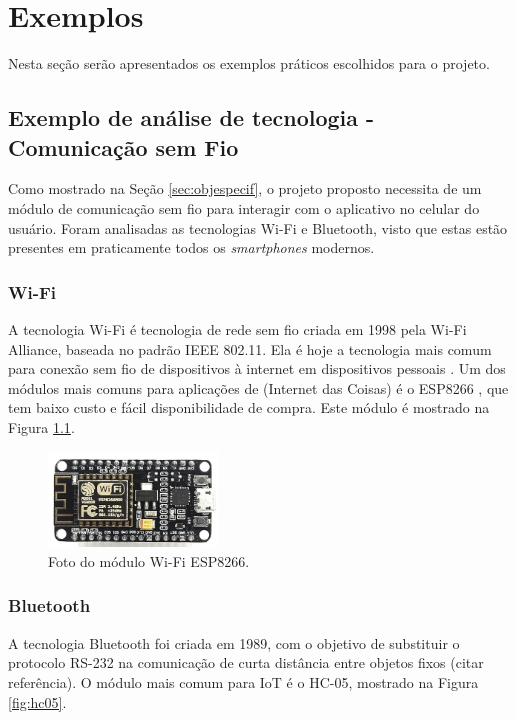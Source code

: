 \chapter{Exemplos}

Nesta seção serão apresentados os exemplos práticos escolhidos para o projeto. 

\section{Exemplo de análise de tecnologia - Comunicação sem Fio}
\label{sec:exemplo}
Como mostrado na Seção \ref{sec:objespecif}, o projeto proposto necessita de um módulo de comunicação sem fio para interagir com o aplicativo no celular do usuário. Foram analisadas as tecnologias Wi-Fi e Bluetooth, visto que estas estão presentes em praticamente todos os \textit{smartphones} modernos.

\subsection{Wi-Fi}
\label{sec:wifi}

A tecnologia Wi-Fi é tecnologia de rede sem fio criada em 1998 pela Wi-Fi Alliance, baseada no padrão IEEE 802.11. Ela é hoje a tecnologia mais comum para conexão sem fio de dispositivos à internet em dispositivos pessoais \cite{WiFi2020}. Um dos módulos mais comuns para aplicações de  (Internet das Coisas) é o ESP8266 \cite{datasheet8266}, que tem baixo custo e fácil disponibilidade de compra. Este módulo é mostrado na Figura \ref{fig:esp8266}.

\begin{figure}[!htb]
	\centering
	\includegraphics[width=0.4\textwidth]{./esp8266.png} 
	\caption{Foto do módulo Wi-Fi ESP8266.}
	\label{fig:esp8266}
\end{figure}

\subsection{Bluetooth}
\label{sec:bt}
A tecnologia Bluetooth foi criada em 1989, com o objetivo de substituir o protocolo RS-232 na comunicação de curta distância entre objetos fixos (citar referência). O módulo mais comum para IoT é o HC-05, mostrado na Figura \ref{fig:hc05}.

